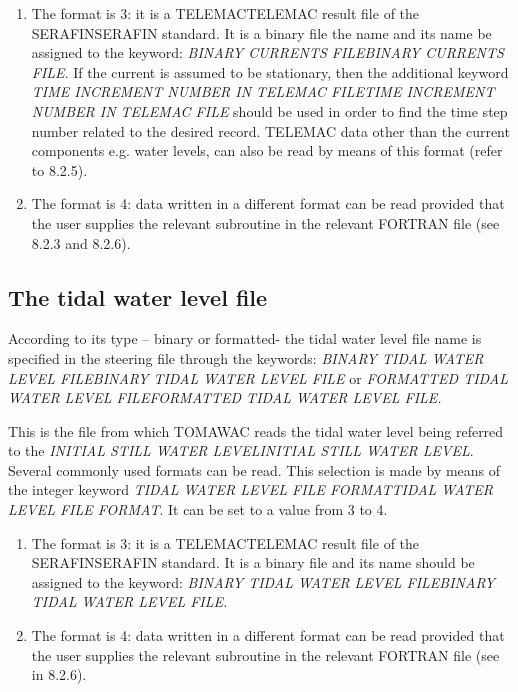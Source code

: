 \begin{enumerate}
\item  The format is 3: it is a TELEMACTELEMAC result file of the SERAFINSERAFIN standard. It is a binary file the name and its name be assigned to the keyword: \textit{BINARY CURRENTS FILEBINARY CURRENTS FILE}. If the current is assumed to be stationary, then the additional keyword \textit{TIME INCREMENT NUMBER IN TELEMAC FILETIME INCREMENT NUMBER IN TELEMAC FILE }should be used in order to find the time step number related to the desired record. TELEMAC data other than the current components e.g. water levels, can also be read by means of this format (refer to 8.2.5).

\item  The format is 4: data written in a different format can be read provided that the user supplies the relevant subroutine in the relevant FORTRAN file (see 8.2.3 and 8.2.6).
\end{enumerate}


\subsection{ The tidal water level file}

 According to its type -- binary or formatted- the tidal water level file name is specified in the steering file through the keywords: \textit{BINARY TIDAL WATER LEVEL FILEBINARY TIDAL WATER LEVEL FILE }or\textit{ FORMATTED TIDAL WATER LEVEL FILEFORMATTED TIDAL WATER LEVEL FILE.}

 This is the file from which TOMAWAC reads the tidal water level being referred to the \textit{INITIAL STILL WATER LEVELINITIAL STILL WATER LEVEL}. Several commonly used formats can be read. This selection is made by means of the integer keyword \textit{TIDAL WATER LEVEL FILE FORMATTIDAL WATER LEVEL FILE FORMAT}. It can\textit{ }be set to a value from 3 to 4.

\begin{enumerate}
\item  The format is 3: it is a TELEMACTELEMAC result file of the SERAFINSERAFIN standard. It is a binary file and its name should be assigned to the keyword: \textit{BINARY TIDAL WATER LEVEL FILEBINARY TIDAL WATER LEVEL FILE.}

\item  The format is 4: data written in a different format can be read provided that the user supplies the relevant subroutine in the relevant FORTRAN file (see in 8.2.6).
\end{enumerate}


